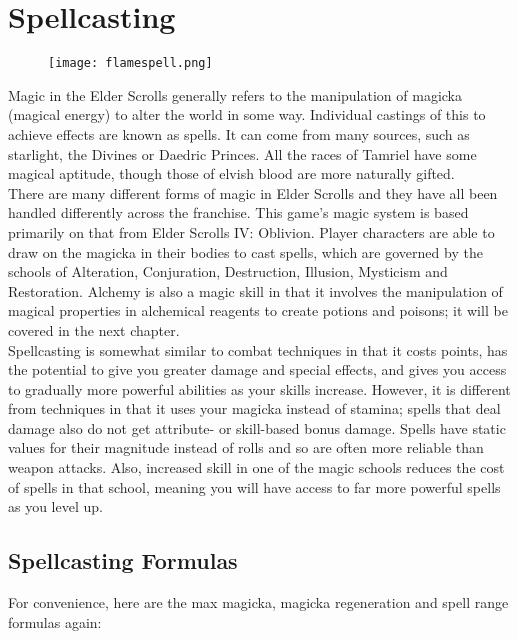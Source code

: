 \chapter{Spellcasting}

\begin{figure}[h]
	\texttt{[image: flamespell.png]}
\end{figure}

Magic in the Elder Scrolls generally refers to the manipulation of magicka (magical energy) to alter the world in some way. Individual castings of this to achieve effects are known as spells. It can come from many sources, such as starlight, the Divines or Daedric Princes. All the races of Tamriel have some magical aptitude, though those of elvish blood are more naturally gifted.\\

There are many different forms of magic in Elder Scrolls and they have all been handled differently across the franchise. This game's magic system is based primarily on that from Elder Scrolls IV: Oblivion. Player characters are able to draw on the magicka in their bodies to cast spells, which are governed by the schools of Alteration, Conjuration, Destruction, Illusion, Mysticism and Restoration. Alchemy is also a magic skill in that it involves the manipulation of magical properties in alchemical reagents to create potions and poisons; it will be covered in the next chapter.\\

Spellcasting is somewhat similar to combat techniques in that it costs points, has the potential to give you greater damage and special effects, and gives you access to gradually more powerful abilities as your skills increase. However, it is different from techniques in that it uses your magicka instead of stamina; spells that deal damage also do not get attribute- or skill-based bonus damage. Spells have static values for their magnitude instead of rolls and so are often more reliable than weapon attacks. Also, increased skill in one of the magic schools reduces the cost of spells in that school, meaning you will have access to far more powerful spells as you level up.

\section{Spellcasting Formulas}
For convenience, here are the max magicka, magicka regeneration and spell range formulas again:

